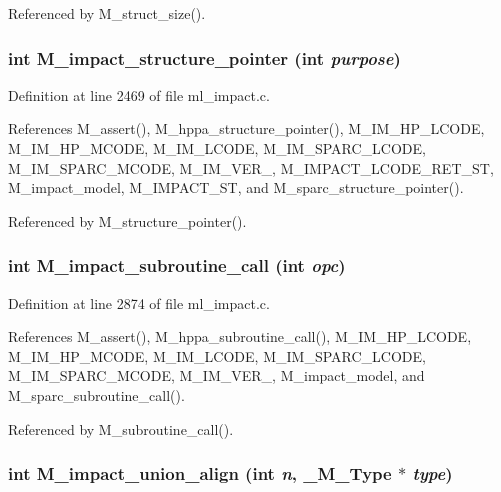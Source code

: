 Referenced by M\_\-struct\_\-size().
\subsubsection{\setlength{\rightskip}{0pt plus 5cm}int M\_\-impact\_\-structure\_\-pointer (int {\em purpose})}\label{ml__impact_8c_1e48123c0c27b0057bc099de33959c55}




Definition at line 2469 of file ml\_\-impact.c.

References M\_\-assert(), M\_\-hppa\_\-structure\_\-pointer(), M\_\-IM\_\-HP\_\-LCODE, M\_\-IM\_\-HP\_\-MCODE, M\_\-IM\_\-LCODE, M\_\-IM\_\-SPARC\_\-LCODE, M\_\-IM\_\-SPARC\_\-MCODE, M\_\-IM\_\-VER\_, M\_\-IMPACT\_\-LCODE\_\-RET\_\-ST, M\_\-impact\_\-model, M\_\-IMPACT\_\-ST, and M\_\-sparc\_\-structure\_\-pointer().

Referenced by M\_\-structure\_\-pointer().
\subsubsection{\setlength{\rightskip}{0pt plus 5cm}int M\_\-impact\_\-subroutine\_\-call (int {\em opc})}\label{ml__impact_8c_2fec04e2059724cadae6a4b3887cf5fc}




Definition at line 2874 of file ml\_\-impact.c.

References M\_\-assert(), M\_\-hppa\_\-subroutine\_\-call(), M\_\-IM\_\-HP\_\-LCODE, M\_\-IM\_\-HP\_\-MCODE, M\_\-IM\_\-LCODE, M\_\-IM\_\-SPARC\_\-LCODE, M\_\-IM\_\-SPARC\_\-MCODE, M\_\-IM\_\-VER\_, M\_\-impact\_\-model, and M\_\-sparc\_\-subroutine\_\-call().

Referenced by M\_\-subroutine\_\-call().
\subsubsection{\setlength{\rightskip}{0pt plus 5cm}int M\_\-impact\_\-union\_\-align (int {\em n}, \bf{\_\-M\_\-Type} $\ast$ {\em type})}\label{ml__impact_8c_2e5cd8e5ebff2487d4335bf77585cbf3}




